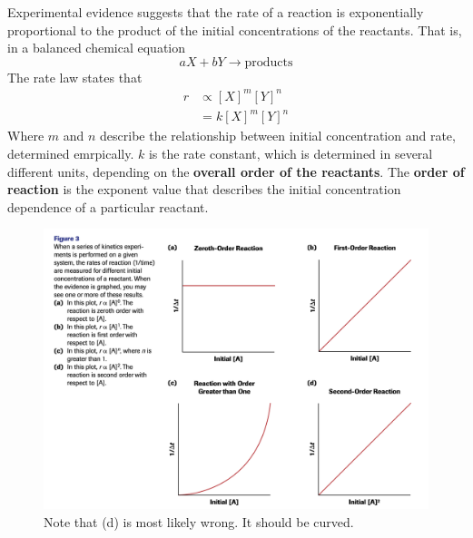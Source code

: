 Experimental evidence suggests that the rate of a reaction is exponentially proportional to 
the product of the initial concentrations of the reactants. That is, in a balanced chemical equation
\[
    aX+bY\to \text{products}
\]
The rate law states that
\begin{align*}
    r&\propto [X]^m[Y]^n\\
     &=k[X]^m[Y]^n
\end{align*}
Where $m$ and $n$ describe the relationship between initial concentration and rate, determined
emrpically. $k$ is the rate constant, which is determined in several different units, depending
on the \textbf{overall order of the reactants}. The \textbf{order of reaction} is the exponent value
that describes the initial concentration dependence of a particular reactant.

\newpage
\begin{figure}[ht!]
    \centering
    \includegraphics[width=\textwidth]{../figures/order of reaction.png}
    \caption{Note that (d) is most likely wrong. It should be curved.}
\end{figure}

